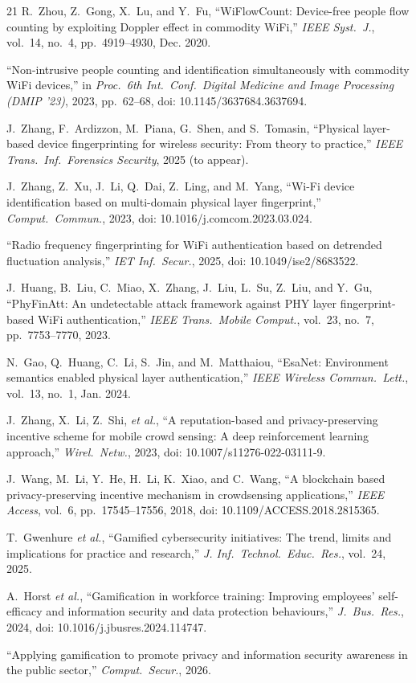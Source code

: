 \documentclass[journal,10pt]{IEEEtran}
\begin{document}
\begin{thebibliography}{21}
 R.~Zhou, Z.~Gong, X.~Lu, and Y.~Fu, ``WiFlowCount:
Device-free people flow counting by exploiting Doppler effect in commodity
WiFi,'' \emph{IEEE Syst.~J.}, vol.~14, no.~4, pp.~4919--4930, Dec. 2020.

 ``Non-intrusive people counting and identification
simultaneously with commodity WiFi devices,'' in \emph{Proc.\ 6th Int.\ Conf.\
Digital Medicine and Image Processing (DMIP '23)}, 2023, pp.~62--68, doi:
10.1145/3637684.3637694.

 J.~Zhang, F.~Ardizzon, M.~Piana, G.~Shen, and
S.~Tomasin, ``Physical layer-based device fingerprinting for wireless security:
From theory to practice,'' \emph{IEEE Trans.\ Inf.\ Forensics Security},
2025 (to appear).

 J.~Zhang, Z.~Xu, J.~Li, Q.~Dai, Z.~Ling, and M.~Yang,
``Wi-Fi device identification based on multi-domain physical layer
fingerprint,'' \emph{Comput.\ Commun.}, 2023, doi: 10.1016/j.comcom.2023.03.024.

 ``Radio frequency fingerprinting for WiFi authentication based
on detrended fluctuation analysis,'' \emph{IET Inf.\ Secur.}, 2025, doi:
10.1049/ise2/8683522.

 J.~Huang, B.~Liu, C.~Miao, X.~Zhang, J.~Liu, L.~Su, Z.~Liu,
and Y.~Gu, ``PhyFinAtt: An undetectable attack framework against PHY layer
fingerprint-based WiFi authentication,'' \emph{IEEE Trans.\ Mobile Comput.},
vol.~23, no.~7, pp.~7753--7770, 2023.

 N.~Gao, Q.~Huang, C.~Li, S.~Jin, and M.~Matthaiou, ``EsaNet:
Environment semantics enabled physical layer authentication,'' \emph{IEEE
Wireless Commun.\ Lett.}, vol.~13, no.~1, Jan. 2024.

 J.~Zhang, X.~Li, Z.~Shi, \emph{et al.}, ``A reputation-based
and privacy-preserving incentive scheme for mobile crowd sensing: A deep
reinforcement learning approach,'' \emph{Wirel.\ Netw.}, 2023, doi:
10.1007/s11276-022-03111-9.

 J.~Wang, M.~Li, Y.~He, H.~Li, K.~Xiao, and C.~Wang, ``A
blockchain based privacy-preserving incentive mechanism in crowdsensing
applications,'' \emph{IEEE Access}, vol.~6, pp.~17545--17556, 2018, doi:
10.1109/ACCESS.2018.2815365.

 T.~Gwenhure \emph{et al.}, ``Gamified cybersecurity
initiatives: The trend, limits and implications for practice and research,''
\emph{J. Inf.\ Technol.\ Educ.\ Res.}, vol.~24, 2025.

 A.~Horst \emph{et al.}, ``Gamification in workforce
training: Improving employees' self-efficacy and information security and data
protection behaviours,'' \emph{J.~Bus.\ Res.}, 2024, doi:
10.1016/j.jbusres.2024.114747.

 ``Applying gamification to promote privacy and
information security awareness in the public sector,'' \emph{Comput.\ Secur.},
2026.

\end{thebibliography}
\end{document}
